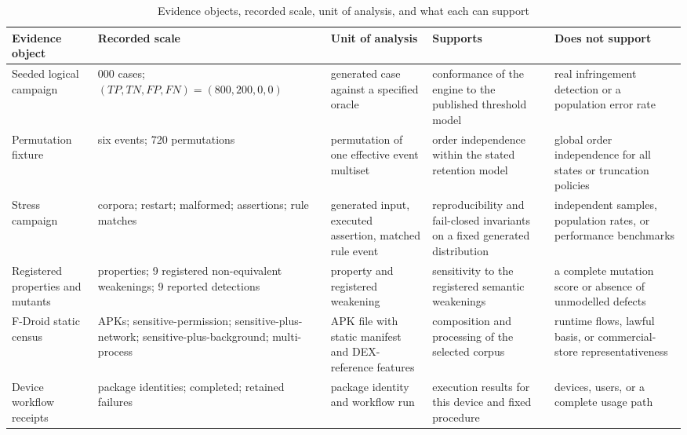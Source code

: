 \begin{table}[H]
\centering
\caption{Evidence objects, recorded scale, unit of analysis, and what each can support}
\label{tab:evidence-objects}
\scriptsize
\setlength{\tabcolsep}{3pt}
\begin{tabular}{>{\raggedright\arraybackslash}p{}>{\raggedright\arraybackslash}p{}>{\raggedright\arraybackslash}p{}>{\raggedright\arraybackslash}p{}>{\raggedright\arraybackslash}p{}}
\toprule
Evidence object & Recorded scale & Unit of analysis & Supports & Does not support \\
\midrule
Seeded logical campaign & 1{,}000 cases; $(TP,TN,FP,FN)=(800,200,0,0)$ & generated case against a specified oracle & conformance of the engine to the published threshold model & real infringement detection or a population error rate \\
Permutation fixture & six events; 720 permutations & permutation of one effective event multiset & order independence within the stated retention model & global order independence for all states or truncation policies \\
Stress campaign & \StressCorpusN{} corpora; \StressRestartN{} restart; \StressMalformedN{} malformed; \StressAssertionsN{} assertions; \StressRuleMatchesN{} rule matches & generated input, executed assertion, matched rule event & reproducibility and fail-closed invariants on a fixed generated distribution & independent samples, population rates, or performance benchmarks \\
Registered properties and mutants & 9 properties; 9 registered non-equivalent weakenings; 9 reported detections & property and registered weakening & sensitivity to the registered semantic weakenings & a complete mutation score or absence of unmodelled defects \\
F-Droid static census & \FDroidCensusN{} APKs; \FDroidSensitiveN{} sensitive-permission; \FDroidSensitiveNetworkN{} sensitive-plus-network; \FDroidSensitiveBackgroundN{} sensitive-plus-background; \FDroidMultiProcessN{} multi-process & APK file with static manifest and DEX-reference features & composition and processing of the selected corpus & runtime flows, lawful basis, or commercial-store representativeness \\
Device workflow receipts & \DevicePackagesN{} package identities; \CompletedWorkflowsN{} completed; \FailedDeviceWorkflowsN{} retained failures & package identity and workflow run & execution results for this device and fixed procedure & \DevicePackagesN{} devices, \DevicePackagesN{} users, or a complete usage path \\

\end{tabular}
\end{table}
